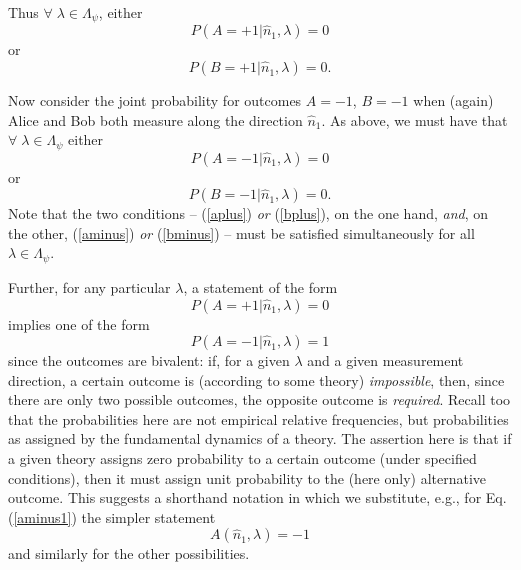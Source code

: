\documentclass[aps,prc,onecolumn,12pt,nofootinbib]{revtex4-2}
\begin{document}
Thus $\forall \; \lambda \in \Lambda_\psi$, either
\begin{equation}
P(A=+1 | \hat{n}_1, \lambda) = 0
\label{aplus}
\end{equation}
 or
\begin{equation}
P(B=+1 | \hat{n}_1, \lambda) = 0.
\label{bplus}
\end{equation}

Now consider the joint probability for outcomes $A = -1$, $B=-1$ when
(again) Alice and Bob both measure along the direction $\hat{n}_1$.
As above, we must have
that $ \forall \; \lambda \in \Lambda_\psi$ either
\begin{equation}
P(A=-1 | \hat{n}_1, \lambda) = 0
\label{aminus}
\end{equation}
or
\begin{equation}
P(B=-1 | \hat{n}_1, \lambda) = 0.
\label{bminus}
\end{equation}
Note that the two conditions -- (\ref{aplus}) \emph{or} (\ref{bplus}), on the
one hand, \emph{and}, on the other, (\ref{aminus}) \emph{or} (\ref{bminus})
-- must be satisfied simultaneously for all $\lambda \in \Lambda_\psi$.

Further, for any particular $\lambda$, a statement
of the form
\begin{equation}
P(A=+1 | \hat{n}_1, \lambda)=0
\end{equation}
implies one of the form
\begin{equation}
P(A=-1 | \hat{n}_1, \lambda) = 1
\label{aminus1}
\end{equation}
since the outcomes are bivalent:  if, for a given $\lambda$ and a
given measurement direction, a certain outcome is (according to some
theory) \emph{impossible},
then, since there are only two possible outcomes,
the opposite outcome is \emph{required}.  Recall too that the
probabilities here are not empirical relative frequencies, but
probabilities as assigned by the fundamental dynamics of a theory.
The assertion
here is that if a given theory assigns zero probability to a
certain outcome (under specified conditions), then it must assign
unit probability to the (here only) alternative outcome.  This
suggests a shorthand notation in which we substitute, e.g.,
for Eq. (\ref{aminus1}) the simpler statement
\begin{equation}
A(\hat{n}_1, \lambda) = -1
\label{aisminus1}
\end{equation}
and similarly for the other possibilities.
\end{document}
